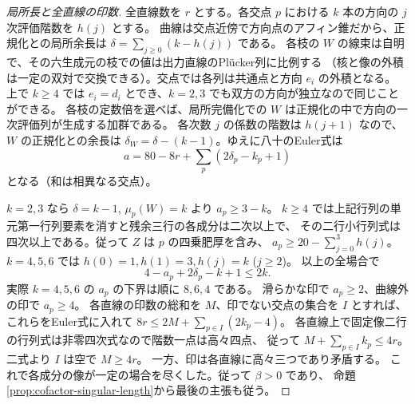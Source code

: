 \begin{proof}[局所長と全直線の印数]
全直線数を $r$ とする。各交点 $p$ における $k$ 本の方向の $j$ 次評価階数を $h(j)$ とする。
曲線は交点近傍で方向点のアフィン錐だから、正規化との局所余長は
$\delta=\sum_{j\ge0}(k-h(j))$ である。
各枝の $W$ の線束は自明で、その六生成元の枝での値は出力直線のPlücker列に比例する
（核と像の外積は一定の双対で交換できる）。交点では各列は共通点と方向 $e_i$ の外積となる。
上で $k\ge4$ では $e_i=d_i$ とでき、$k=2,3$ でも双方の方向が独立なので同じことができる。
各枝の定数倍を選べば、局所完備化での $W$ は正規化の中で方向の一次評価列が生成する加群である。
各次数 $j$ の係数の階数は $h(j+1)$ なので、$W$ の正規化との余長は
$\delta_W=\delta-(k-1)$。ゆえに八十のEuler式は
\[
      a=80-8r+\sum_p(2\delta_p-k_p+1)
\]
となる（和は相異なる交点）。

$k=2,3$ なら $\delta=k-1$, $\mu_p(W)=k$ より $a_p\ge3-k$。
$k\ge4$ では上記行列の単元第一行列要素を消すと残余三行の各成分は二次以上で、
その二行小行列式は四次以上である。従って $Z$ は $p$ の四乗肥厚を含み、
$a_p\ge20-\sum_{j=0}^3h(j)$。$k=4,5,6$ では $h(0)=1,h(1)=3,h(j)=k$ ($j\ge2$)。
以上の全場合で
\[
                      4-a_p+2\delta_p-k+1\le2k .
\]
実際 $k=4,5,6$ の $a_p$ の下界は順に $8,6,4$ である。
滑らかな印で $a_p\ge2$、曲線外の印で $a_p\ge4$。
各直線の印数の総和を $M$、印でない交点の集合を $I$ とすれば、これらをEuler式に入れて
$8r\le2M+\sum_{p\in I}(2k_p-4)$。
各直線上で固定像二行の行列式は非零四次式なので階数一点は高々四点、
従って $M+\sum_{p\in I}k_p\le4r$。二式より $I$ は空で $M\ge4r$。
一方、印は各直線に高々三つであり矛盾する。
これで各成分の像が一定の場合を尽くした。従って $\beta>0$ であり、
命題\ref{prop:cofactor-singular-length}から最後の主張も従う。
\end{proof}
